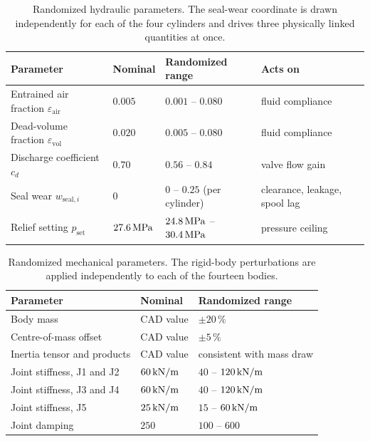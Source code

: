 \begin{table}[htbp]
  \centering
  \caption{Randomized hydraulic parameters. The seal-wear coordinate is
  drawn independently for each of the four cylinders and drives three
  physically linked quantities at once.}
  \label{tab:data:hydraulic}
  \small
  \begin{tabular}{llll}
    \toprule
    Parameter & Nominal & Randomized range & Acts on \\
    \midrule
    Entrained air fraction $\varepsilon_{\mathrm{air}}$
      & $0.005$ & $0.001$ -- $0.080$ & fluid compliance \\
    Dead-volume fraction $\varepsilon_{\mathrm{vol}}$
      & $0.020$ & $0.005$ -- $0.080$ & fluid compliance \\
    Discharge coefficient $c_d$
      & $0.70$ & $0.56$ -- $0.84$ & valve flow gain \\
    Seal wear $w_{\mathrm{seal},i}$
      & $0$ & $0$ -- $0.25$ (per cylinder)
      & clearance, leakage, spool lag \\
    Relief setting $p_{\mathrm{set}}$
      & $\unit[27.6]{MPa}$ & $\unit[24.8]{MPa}$ -- $\unit[30.4]{MPa}$
      & pressure ceiling \\
    \bottomrule
  \end{tabular}
\end{table}

\begin{table}[htbp]
  \centering
  \caption{Randomized mechanical parameters. The rigid-body
  perturbations are applied independently to each of the fourteen
  bodies.}
  \label{tab:data:mechanical}
  \small
  \begin{tabular}{lll}
    \toprule
    Parameter & Nominal & Randomized range \\
    \midrule
    Body mass & CAD value & $\pm 20\,\%$ \\
    Centre-of-mass offset & CAD value & $\pm 5\,\%$ \\
    Inertia tensor and products & CAD value & consistent with mass draw \\
    Joint stiffness, J1 and J2 & $\unit[60]{kN/m}$ & $40$ -- $\unit[120]{kN/m}$ \\
    Joint stiffness, J3 and J4 & $\unit[60]{kN/m}$ & $40$ -- $\unit[120]{kN/m}$ \\
    Joint stiffness, J5 & $\unit[25]{kN/m}$ & $15$ -- $\unit[60]{kN/m}$ \\
    Joint damping & $250$ & $100$ -- $600$ \\
    \bottomrule
  \end{tabular}
\end{table}

